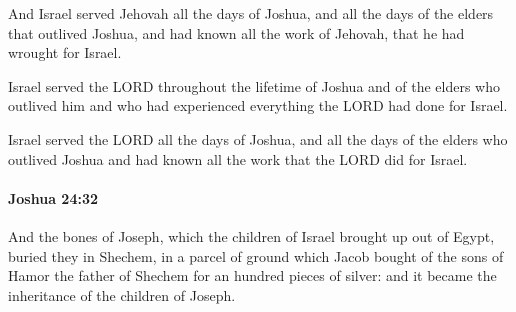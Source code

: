 			\begin{versebox}
					\item[BHS] 
					\item[ASV] And Israel served Jehovah all the days of Joshua, and all the days of the elders that outlived Joshua, and had known all the work of Jehovah, that he had wrought for Israel.
					\item[NIV] Israel served the LORD throughout the lifetime of Joshua and of the elders who outlived him and who had experienced everything the LORD had done for Israel.
					\item[NRSV] Israel served the LORD all the days of Joshua, and all the days of the elders who outlived Joshua and had known all the work that the LORD did for Israel.
			\end{versebox}

		\paragraph{Joshua 24:32} %
			\label{JOSHUA-24-32}

			And the bones of Joseph, which the children of Israel brought up out of Egypt, buried they in Shechem, in a parcel of ground which Jacob bought of the sons of Hamor the father of Shechem for an hundred pieces of silver: and it became the inheritance of the children of Joseph.

